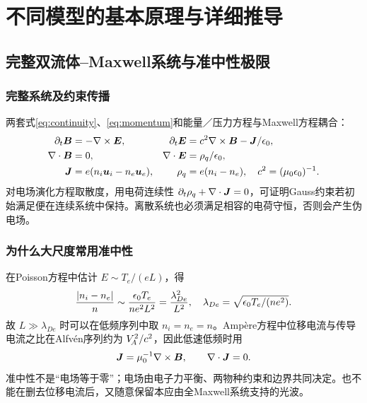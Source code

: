 \chapter{不同模型的基本原理与详细推导}\label{ch:models}



\section{完整双流体--Maxwell系统与准中性极限}
\subsection{完整系统及约束传播}
两套式\eqref{eq:continuity}、\eqref{eq:momentum}和能量／压力方程与Maxwell方程耦合：
\begin{align}
\partial_t\bm{B}&=-\nabla\times\bm{E},&\partial_t\bm{E}&=c^2\nabla\times\bm{B}-\bm{J}/\epsilon_0,\\
\nabla\cdot\bm{B}&=0,&\nabla\cdot\bm{E}&=\rho_q/\epsilon_0,\\
\bm{J}&=e(n_i\bm{u}_i-n_e\bm{u}_e),&\rho_q&=e(n_i-n_e),\quad c^2=(\mu_0\epsilon_0)^{-1}.
\end{align}
对电场演化方程取散度，用电荷连续性 $\partial_t\rho_q+\nabla\cdot\bm{J}=0$，可证明Gauss约束若初始满足便在连续系统中保持。离散系统也必须满足相容的电荷守恒，否则会产生伪电场。

\subsection{为什么大尺度常用准中性}
在Poisson方程中估计 $E\sim T_e/(eL)$，得
\begin{equation}{|n_i-n_e|\over n}\sim{\epsilon_0T_e\over ne^2L^2}
={\lambda_{De}^2\over L^2},\quad\lambda_{De}=\sqrt{\epsilon_0T_e/(ne^2)}.
\end{equation}
故 $L\gg\lambda_{De}$ 时可以在低频序列中取 $n_i=n_e=n$。Ampère方程中位移电流与传导电流之比在Alfvén序列约为 $V_{\!A}^2/c^2$，因此低速低频时用
\begin{equation}\bm{J}=\mu_0^{-1}\nabla\times\bm{B},\qquad\nabla\cdot\bm{J}=0.\label{eq:ampere}\end{equation}
准中性不是“电场等于零”；电场由电子力平衡、两物种约束和边界共同决定。也不能在删去位移电流后，又随意保留本应由全Maxwell系统支持的光波。

